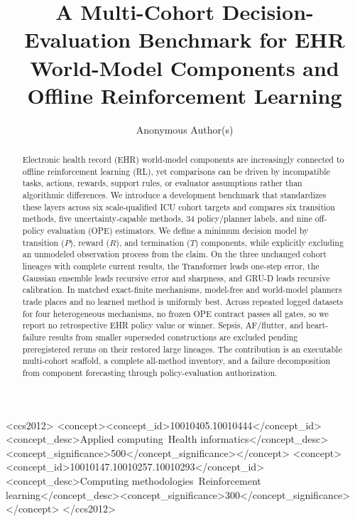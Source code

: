 \documentclass[sigconf,review]{acmart}
\title{A Multi-Cohort Decision-Evaluation Benchmark for EHR World-Model Components and Offline Reinforcement Learning}
\author{Anonymous Author(s)}
\affiliation{%
  \institution{Anonymous Institution}
  \city{Anonymous}
  \country{Anonymous}}
\begin{document}
\begin{abstract}
Electronic health record (EHR) world-model components are increasingly connected to offline reinforcement learning (RL), yet comparisons can be driven by incompatible tasks, actions, rewards, support rules, or evaluator assumptions rather than algorithmic differences. We introduce a development benchmark that standardizes these layers across six scale-qualified ICU cohort targets and compares six transition methods, five uncertainty-capable methods, 34 policy/planner labels, and nine off-policy evaluation (OPE) estimators. We define a minimum decision model by transition ($P$), reward ($R$), and termination ($T$) components, while explicitly excluding an unmodeled observation process from the claim. On the three unchanged cohort lineages with complete current results, the Transformer leads one-step error, the Gaussian ensemble leads recursive error and sharpness, and GRU-D leads recursive calibration. In matched exact-finite mechanisms, model-free and world-model planners trade places and no learned method is uniformly best. Across repeated logged datasets for four heterogeneous mechanisms, no frozen OPE contract passes all gates, so we report no retrospective EHR policy value or winner. Sepsis, AF/flutter, and heart-failure results from smaller superseded constructions are excluded pending preregistered reruns on their restored large lineages. The contribution is an executable multi-cohort scaffold, a complete all-method inventory, and a failure decomposition from component forecasting through policy-evaluation authorization.
\end{abstract}


\begin{CCSXML}
<ccs2012>
 <concept><concept_id>10010405.10010444</concept_id><concept_desc>Applied computing~Health informatics</concept_desc><concept_significance>500</concept_significance></concept>
 <concept><concept_id>10010147.10010257.10010293</concept_id><concept_desc>Computing methodologies~Reinforcement learning</concept_desc><concept_significance>300</concept_significance></concept>
</ccs2012>
\end{CCSXML}
\maketitle
\end{document}
